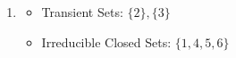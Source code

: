 \documentclass[12pt]{article}
\begin{document}
\begin{enumerate}[label=(\alph*)]
\item
        \begin{minipage}[t]{0.4\textwidth}
          \centering{}
        
        
        \end{minipage}\hfill
        \begin{minipage}[t]{0.65\textwidth}
          \vspace{3\baselineskip}
          \begin{itemize}
                \item Transient Sets: $\{2\}, \{3\}$
                \item Irreducible Closed Sets: $\{1,4,5,6\}$          \end{itemize}
        \end{minipage}
        


\end{enumerate}
\end{document}
